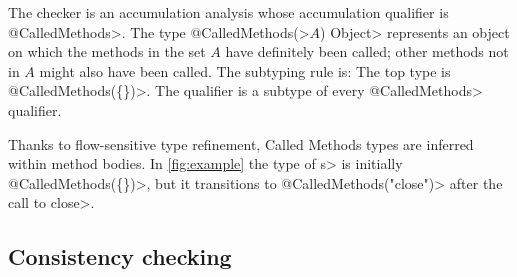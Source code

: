 The checker is an accumulation analysis whose accumulation qualifier is \<@CalledMethods>.
The type \<@CalledMethods(>$A$\<) Object>
represents an object on which the methods in the set $A$ have definitely
been called; other methods not in $A$ might also have been called.
The subtyping
rule is:
The top type is \<@CalledMethods(\{\})>.
The qualifier \CalledMethodsBottom is a subtype of every \<@CalledMethods> qualifier.

Thanks to flow-sensitive type refinement,
Called Methods types are inferred within method bodies.
In \cref{fig:example} the type of \<s> is initially \<@CalledMethods(\{\})>,
but it transitions to \<@CalledMethods("close")> after the call to \<close>.


\subsection{Consistency checking}
\label{sec:must-call-invoked}

